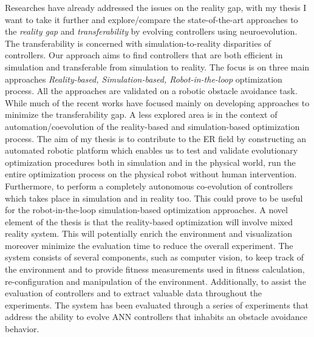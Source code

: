 Researches have already addressed the issues on the reality gap, with my thesis I want to take it further and explore/compare the state-of-the-art approaches to the \emph{reality gap} and \emph{transferability} by evolving controllers using neuroevolution. The transferability is concerned with simulation-to-reality disparities of controllers. Our approach aims to find controllers that are both efficient in simulation and transferable from simulation to reality. The focus is on three main approaches \emph{Reality-based, Simulation-based, Robot-in-the-loop} optimization process.  All the approaches are validated on a robotic obstacle avoidance task. While much of the recent works have focused mainly on developing approaches to minimize the transferability gap. A less explored area is in the context of automation/coevolution of the reality-based and simulation-based optimization process. The aim of my thesis is to contribute to the ER field by constructing an automated robotic platform which enables us to test and validate evolutionary optimization procedures both in simulation and in the physical world, run the entire optimization process on the physical robot without human intervention. Furthermore, to perform a completely autonomous co-evolution of controllers which takes place in simulation and in reality too. This could prove to be useful for the robot-in-the-loop simulation-based optimization approaches. A novel element of the thesis is that the reality-based optimization will involve mixed reality system. This will potentially enrich the environment and visualization moreover minimize the evaluation time to reduce the overall experiment. The system consists of several components, such as computer vision, to keep track of the environment and to provide fitness measurements used in fitness calculation, re-configuration and manipulation of the environment. Additionally, to assist the evaluation of controllers and to extract valuable data throughout the experiments. The system has been evaluated through a series of experiments that address the ability to evolve ANN controllers that inhabits an obstacle avoidance behavior.